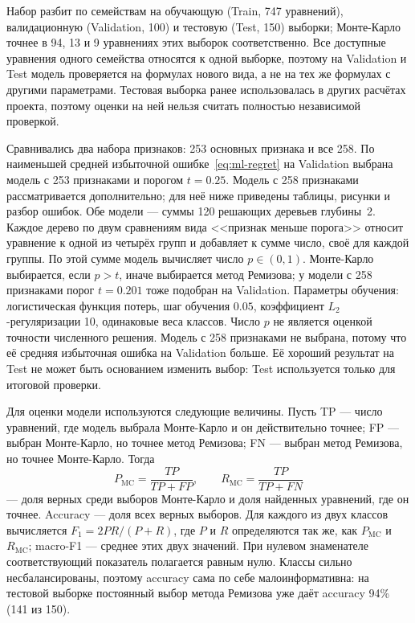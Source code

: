 \documentclass[14pt,a4paper]{extarticle}
\begin{document}
Набор разбит по семействам на обучающую (Train, 747 уравнений),
валидационную (Validation, 100) и тестовую (Test, 150) выборки;
Монте-Карло точнее в 94, 13 и 9 уравнениях этих выборок соответственно.
Все доступные уравнения одного семейства относятся к одной выборке, поэтому
на Validation и Test модель проверяется на формулах нового вида,
а не на тех же формулах с другими параметрами. Тестовая выборка ранее
использовалась в других расчётах проекта, поэтому оценки на ней нельзя
считать полностью независимой проверкой.

Сравнивались два набора признаков: 253 основных признака и все 258.
По наименьшей средней избыточной ошибке~\eqref{eq:ml-regret}
на Validation выбрана модель с 253 признаками и порогом $t=0.25$.
Модель с 258 признаками рассматривается дополнительно; для неё ниже
приведены таблицы, рисунки и разбор ошибок. Обе модели --- суммы
120 решающих деревьев глубины~2.
Каждое дерево по двум сравнениям вида <<признак меньше порога>> относит
уравнение к одной из четырёх групп и добавляет к сумме число, своё
для каждой группы. По этой сумме модель вычисляет число $p\in(0,1)$.
Монте-Карло выбирается, если $p>t$, иначе выбирается метод Ремизова;
у модели с 258 признаками порог $t=0.201$ тоже подобран на Validation.
Параметры обучения: логистическая функция потерь, шаг обучения $0.05$,
коэффициент $L_2$-регуляризации 10, одинаковые веса классов. Число $p$
не является оценкой точности численного решения. Модель с 258
признаками не выбрана, потому что её средняя избыточная ошибка
на Validation больше. Её хороший результат на Test не может быть
основанием изменить выбор: Test используется только для итоговой
проверки.

Для оценки модели используются следующие величины. Пусть TP --- число
уравнений, где модель выбрала Монте-Карло и он действительно точнее;
FP --- выбран Монте-Карло, но точнее метод Ремизова; FN --- выбран метод
Ремизова, но точнее Монте-Карло. Тогда
\[
P_{\mathrm{MC}}=\frac{TP}{TP+FP},\qquad R_{\mathrm{MC}}=\frac{TP}{TP+FN}
\]
--- доля верных среди выборов Монте-Карло и доля найденных уравнений,
где он точнее. Accuracy --- доля всех верных выборов. Для каждого
из двух классов вычисляется $F_1=2PR/(P+R)$, где $P$ и $R$ определяются
так же, как $P_{\mathrm{MC}}$ и $R_{\mathrm{MC}}$; macro-F1 --- среднее
этих двух значений. При нулевом знаменателе соответствующий
показатель полагается равным нулю. Классы сильно несбалансированы,
поэтому accuracy
сама по себе малоинформативна: на тестовой выборке постоянный выбор
метода Ремизова уже даёт accuracy 94\% (141 из 150).
\end{document}
